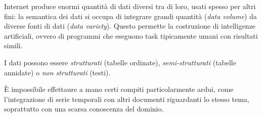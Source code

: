 \documentclass[11pt, twocolumn]{article}
\begin{document}
Internet produce enormi quantità di dati diversi tra di loro, usati spesso per altri fini: la semantica dei dati si occupa di integrare grandi quantità (\textit{data volume}) da diverse fonti di dati (\textit{data variety}).
Questo permette la costruzione di intelligenze artificiali, ovvero di programmi che eseguono task tipicamente umani con risultati simili.

I dati possono essere \textit{strutturati} (tabelle ordinate), \textit{semi-strutturati} (tabelle annidate) o \textit{non strutturati} (testi).

È impossibile effettaure a mano certi compiti particolarmente ardui, come l'integrazione di serie temporali con altri documenti riguardanti lo stesso tema, soprattutto con una scarsa conoscenza del dominio.
\end{document}
